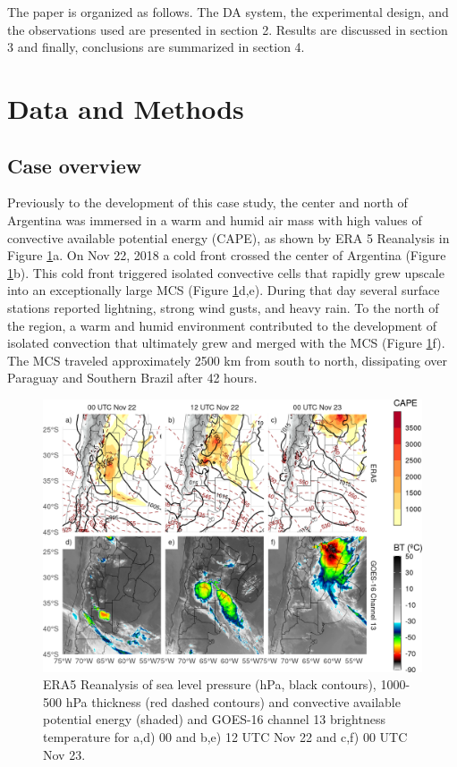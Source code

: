 \documentclass[preprint, 3p, authoryear,review, 12pt]{elsarticle} %
\begin{document}
The paper is organized as follows. The DA system, the experimental design, and the observations used are presented in section 2. Results are discussed in section 3 and finally, conclusions are summarized in section 4.

\hypertarget{data-and-methods}{%
\section{Data and Methods}\label{data-and-methods}}

\hypertarget{case-overview}{%
\subsection{Case overview}\label{case-overview}}

Previously to the development of this case study, the center and north of Argentina was immersed in a warm and humid air mass with high values of convective available potential energy (CAPE), as shown by ERA 5 Reanalysis \citep{era5pressure} in Figure \ref{fig:case}a. On Nov 22, 2018 a cold front crossed the center of Argentina (Figure \ref{fig:case}b). This cold front triggered isolated convective cells that rapidly grew upscale into an exceptionally large MCS (Figure \ref{fig:case}d,e). During that day several surface stations reported lightning, strong wind gusts, and heavy rain. To the north of the region, a warm and humid environment contributed to the development of isolated convection that ultimately grew and merged with the MCS (Figure \ref{fig:case}f).
The MCS traveled approximately 2500 km from south to north, dissipating over Paraguay and Southern Brazil after 42 hours.



\begin{figure}

{\centering \includegraphics{../figures/case-1} 

}

\caption{ERA5 Reanalysis of sea level pressure (hPa, black contours), 1000-500 hPa thickness (red dashed contours) and convective available potential energy (shaded) and GOES-16 channel 13 brightness temperature for a,d) 00 and b,e) 12 UTC Nov 22 and c,f) 00 UTC Nov 23.}\label{fig:case}
\end{figure}
\end{document}
